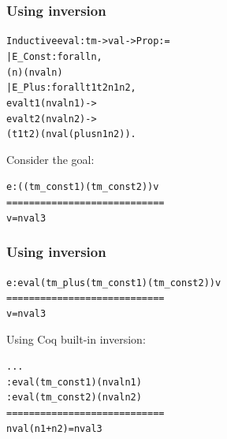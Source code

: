 \documentclass[usenames,dvipsnames]{beamer} %
\begin{document}
\begin{frame}[fragile]
\frametitle{Using inversion}
\small
\begin{alltt}
Inductive eval : tm -> val -> Prop :=
  | E_Const : forall n,
       ( n) (nval n)
  | E_Plus : forall t1 t2 n1 n2,
      eval t1 (nval n1) ->
      eval t2 (nval n2) ->
       ( t1 t2) (nval (plus n1 n2)).
\end{alltt}
Consider the goal:

\begin{alltt}
e :  ( (tm_const 1) (tm_const 2)) v
============================
v = nval 3
\end{alltt}

\end{frame}


\begin{frame}[fragile]
\frametitle{Using inversion}
\small
\begin{alltt}
e : eval (tm_plus (tm_const 1) (tm_const 2)) v
============================
v = nval 3
\end{alltt}
Using Coq built-in inversion:
\begin{alltt}
...
 : eval (tm_const 1) (nval n1)
 : eval (tm_const 2) (nval n2)
============================
nval (n1 + n2) = nval 3
\end{alltt}
\end{frame}
\end{document}
